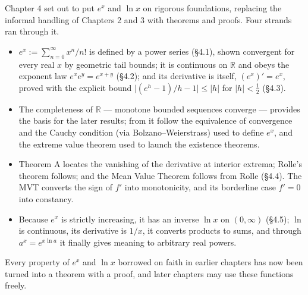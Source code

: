 \documentclass[a4paper,12pt,oneside]{memoir}
\begin{document}
Chapter 4 set out to put \(e^{x}\) and \(\ln x\) on rigorous foundations, replacing the informal handling of Chapters 2 and 3 with theorems and proofs. Four strands ran through it.

\begin{itemize}
  \item {} \(e^{x} := \sum_{n=0}^{\infty} x^{n}/n!\) is defined by a power series (§4.1), shown convergent for every real \(x\) by geometric tail bounds; it is continuous on \(\mathbb{R}\) and obeys the exponent law \(e^{x}e^{y} = e^{x+y}\) (§4.2); and its derivative is itself, \((e^{x})' = e^{x}\), proved with the explicit bound \(\lvert (e^{h}-1)/h - 1 \rvert \le \lvert h \rvert\) for \(\lvert h \rvert < \tfrac{1}{2}\) (§4.3).
  \item {} The completeness of \(\mathbb{R}\) — monotone bounded sequences converge — provides the basis for the later results; from it follow the equivalence of convergence and the Cauchy condition (via Bolzano–Weierstrass) used to define \(e^{x}\), and the extreme value theorem used to launch the existence theorems.
  \item {} Theorem A locates the vanishing of the derivative at interior extrema; Rolle’s theorem follows; and the Mean Value Theorem follows from Rolle (§4.4). The MVT converts the sign of \(f'\) into monotonicity, and its borderline case \(f' = 0\) into constancy.
  \item {} Because \(e^{x}\) is strictly increasing, it has an inverse \(\ln x\) on \((0, \infty)\) (§4.5); \(\ln\) is continuous, its derivative is \(1/x\), it converts products to sums, and through \(a^{x} = e^{x\ln a}\) it finally gives meaning to arbitrary real powers.
\end{itemize}
Every property of \(e^{x}\) and \(\ln x\) borrowed on faith in earlier chapters has now been turned into a theorem with a proof, and later chapters may use these functions freely.
\end{document}

